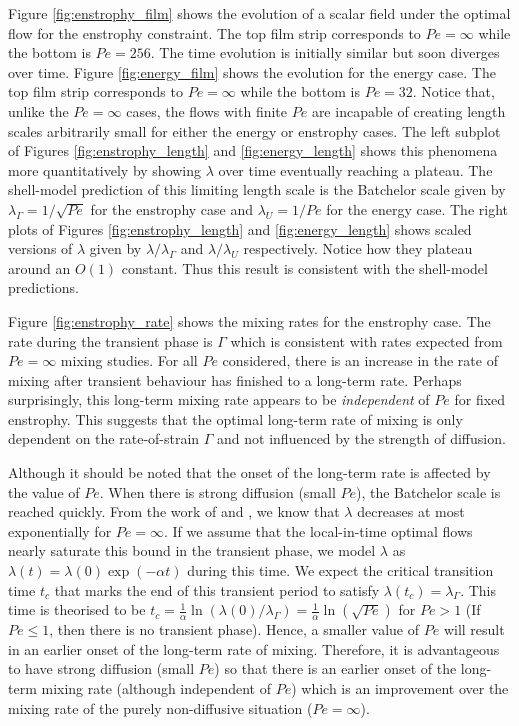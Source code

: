 \documentclass[12pt]{iopart}
\begin{document}
 Figure \ref{fig:enstrophy_film} shows the evolution of a scalar field under the optimal flow for the enstrophy constraint. The top film strip corresponds to $Pe =\infty$ while the bottom is $Pe = 256$. The time evolution is initially similar but soon diverges over time. Figure \ref{fig:energy_film} shows the evolution for the energy case. The top film strip corresponds to $Pe =\infty$ while the bottom is $Pe = 32$. Notice that, unlike the $Pe = \infty$ cases, the flows with finite $Pe$ are incapable of creating length scales arbitrarily small for either the energy or enstrophy cases.  The left subplot of Figures \ref{fig:enstrophy_length} and \ref{fig:energy_length} shows this phenomena more quantitatively by showing $\lambda$ over time eventually reaching a plateau. The shell-model prediction of this limiting length scale is the Batchelor scale given by $\lambda_{\Gamma} = 1/\sqrt{Pe}$ for the enstrophy case and  $\lambda_{U} = 1/Pe$ for the energy case. The right plots of Figures \ref{fig:enstrophy_length} and \ref{fig:energy_length} shows scaled versions of $\lambda$ given by  $\lambda/\lambda_{\Gamma}$ and $\lambda/\lambda_{U}$ respectively.  Notice how they plateau around an $O(1)$ constant. Thus this result is consistent with the shell-model predictions. 
   
Figure \ref{fig:enstrophy_rate} shows the mixing rates for the enstrophy case. The rate during the transient phase is $\Gamma$ which is consistent with rates expected from $Pe=\infty$ mixing studies. For all $Pe$ considered, there is an increase in the rate of mixing after transient behaviour has finished to a long-term rate. Perhaps surprisingly, this long-term mixing rate appears to be {\it independent} of $Pe$ for fixed enstrophy. This suggests that the optimal long-term rate of mixing is only dependent on the rate-of-strain $\Gamma$ and not influenced by the strength of diffusion. 

Although it should be noted that the onset of the long-term rate is affected by the value of $Pe$. When there is strong diffusion (small $Pe$), the Batchelor scale is reached quickly. From the work of \cite{GI2014} and \cite{CS2013}, we know that $\lambda$ decreases at most exponentially for $Pe = \infty$. If we assume that the local-in-time optimal flows nearly saturate this bound in the transient phase, we model $\lambda$ as  $\lambda (t) = \lambda(0)\exp(- \alpha t) $ during this time. We expect the critical transition time $t_{c}$ that marks the end of this transient period to satisfy $\lambda(t_{c})= \lambda_{\Gamma}$. This time is theorised to be $t_{c}=\frac{1}{\alpha}\ln(\lambda(0)/\lambda_{\Gamma}) = \frac{1}{\alpha}\ln ( \sqrt{Pe} )$ for $Pe>1$ (If $Pe \leq 1$, then there is no transient phase). Hence, a smaller value of $Pe$ will result in an earlier onset of the long-term rate of mixing. Therefore, it is advantageous to have strong diffusion (small $Pe$) so that there is an earlier onset of the long-term mixing rate (although independent of $Pe$) which is an improvement over the mixing rate of the purely non-diffusive situation ($Pe=\infty$).
 
\end{document}
